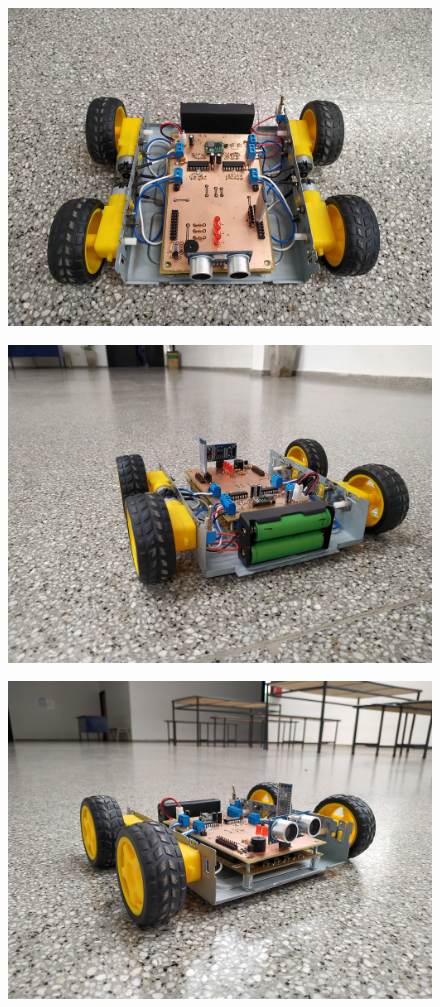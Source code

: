 \begin{figure}[H]
\centering
\includegraphics[width=0.9\linewidth]{imagenes/final2.jpg}
\label{fig:final2}
\end{figure}

\begin{figure}[H]
\centering
\includegraphics[width=0.9\linewidth]{imagenes/final3.jpg}
\label{fig:final3}
\end{figure}

\begin{figure}[H]
	\centering
	\includegraphics[width=0.9\linewidth]{imagenes/final1.jpg}
	\label{fig:final1}
\end{figure}

